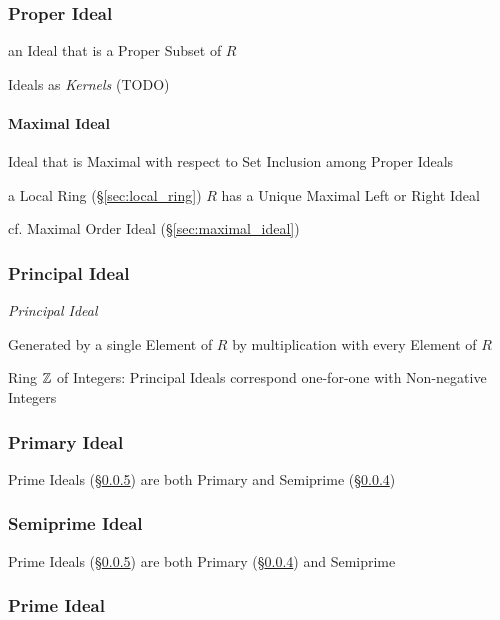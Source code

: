 \subsubsection{Proper Ideal}\label{sec:proper_ideal}

an Ideal that is a Proper Subset of $R$

Ideals as \emph{Kernels} (TODO)



\paragraph{Maximal Ideal}\label{sec:maximal_ring_ideal}\hfill

Ideal that is Maximal with respect to Set Inclusion among Proper Ideals

a Local Ring (\S\ref{sec:local_ring}) $R$ has a Unique Maximal Left or Right
Ideal

cf. Maximal Order Ideal (\S\ref{sec:maximal_ideal})



\subsubsection{Principal Ideal}\label{sec:principal_ideal}

\emph{Principal Ideal}

Generated by a single Element of $R$ by multiplication with every
Element of $R$

Ring $\mathbb{Z}$ of Integers: Principal Ideals correspond one-for-one with
Non-negative Integers



\subsubsection{Primary Ideal}\label{sec:primary_ideal}

Prime Ideals (\S\ref{sec:prime_ideal}) are both Primary and Semiprime
(\S\ref{sec:semiprime_ideal})



\subsubsection{Semiprime Ideal}\label{sec:semiprime_ideal}

Prime Ideals (\S\ref{sec:prime_ideal}) are both Primary
(\S\ref{sec:semiprime_ideal}) and Semiprime



\subsubsection{Prime Ideal}\label{sec:prime_ideal}


